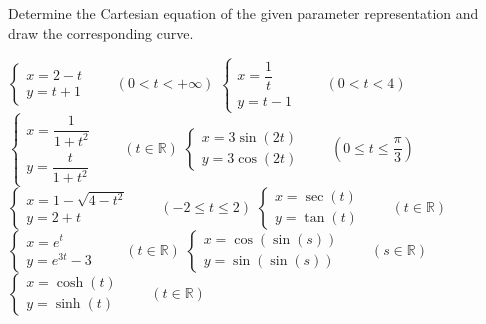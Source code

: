 \subsection*{}

\begin{Exercise}[label=oef_parameterkrommes_tekenen] Determine the Cartesian equation of the given parameter representation  and draw the corresponding curve. 
	\begin{multicols}{2}
		\Question[difficulty = 1] $\left\{\begin{array}{l} x = 2-t \\[0.5cm] y = t+1 \end{array}\right.\qquad (0 < t < + \infty) $ 
		\Question[difficulty = 1] $\left\{\begin{array}{l} x = \dfrac{1}{t} \\[0.5cm] y = t-1 \end{array}\right.\qquad (0 < t < 4) $	
		\Question[difficulty = 2] $\left\{\begin{array}{l} x = \dfrac{1}{1+t^2} \\[0.5cm] y = \dfrac{t}{1+t^2} \end{array}\right.\qquad (t \in \mathbb{R})$
		\ifanalysis\Question[difficulty = 1]\fi\ifcalculus\Question[difficulty = 2]\fi $\left\{\begin{array}{l} x = 3 \sin (2t) \\ y = 3 \cos (2t) \end{array}\right.\qquad \left(0 \leq t \leq \dfrac{\pi}{3} \right) $ 
		\Question[difficulty = 2] $\left\{\begin{array}{l} x = 1-\sqrt{4-t^2} \\ y = 2+t \end{array}\right.\qquad (-2 \leq t \leq 2) $  
		\Question[difficulty = 2] $\left\{\begin{array}{l} x = \sec(t) \\ y = \tan(t) \end{array}\right.\qquad (t \in \mathbb{R}) $
		\Question[difficulty = 1] $\left\{\begin{array}{l} x = e^t \\ y = e^{3t} - 3 \end{array}\right.\qquad (t \in \mathbb{R})$ 
		\ifanalysis
		\Question[difficulty = 2] $\left\{\begin{array}{l} x = \cos (\sin (s)) \\ y = \sin (\sin (s)) \end{array}\right.\qquad (s \in \mathbb{R})$	
		\Question[difficulty = 1] $\left\{\begin{array}{l} x = \cosh(t) \\ y = \sinh(t) \end{array}\right.\qquad (t \in \mathbb{R}) $ 
		\fi
		\EndCurrentQuestion
	\end{multicols}
	
\end{Exercise}

